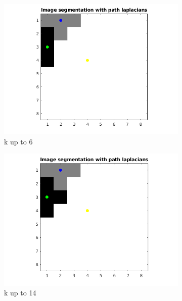 \documentclass[10pt,a4paper]{article}
\begin{document}
\begin{figure}[!h]
\begin{subfigure}[b]{0.45\textwidth}
    	\includegraphics[width=\textwidth]{segmentation-images/8by8longrange6-s2.png}
    	\caption{k up to 6}
    \end{subfigure}
    \begin{subfigure}[b]{0.45\textwidth}
    	\includegraphics[width=\textwidth]{segmentation-images/8by8longrange14-s2.png}
    	\caption{k up to 14}
    \end{subfigure} \\
	\begin{subfigure}[b]{0.45\textwidth}

\end{subfigure}
\end{figure}
\end{document}
